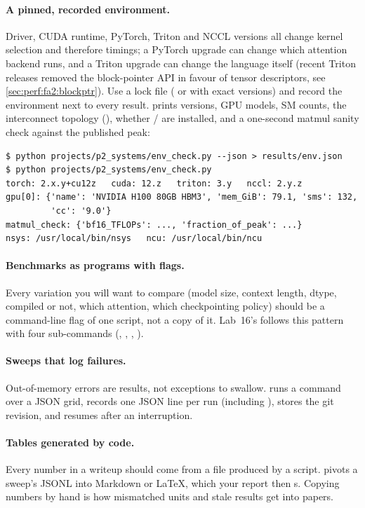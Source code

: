 \paragraph{A pinned, recorded environment.} Driver, CUDA runtime, PyTorch, Triton and NCCL
versions all change kernel selection and therefore timings; a PyTorch upgrade can change which
attention backend runs, and a Triton upgrade can change the language itself (recent Triton
releases removed the block-pointer API in favour of tensor descriptors, see
\cref{sec:perf:fa2:blockptr}). Use a lock file ( or  with exact
versions) and record the environment next to every result. 
prints versions, GPU models, SM counts, the interconnect topology (),
whether / are installed, and a one-second matmul sanity check against the
published peak:

\begin{lstlisting}[style=shell]
$ python projects/p2_systems/env_check.py --json > results/env.json
$ python projects/p2_systems/env_check.py
torch: 2.x.y+cu12z   cuda: 12.z   triton: 3.y   nccl: 2.y.z
gpu[0]: {'name': 'NVIDIA H100 80GB HBM3', 'mem_GiB': 79.1, 'sms': 132,
         'cc': '9.0'}
matmul_check: {'bf16_TFLOPs': ..., 'fraction_of_peak': ...}
nsys: /usr/local/bin/nsys   ncu: /usr/local/bin/ncu
\end{lstlisting}

\paragraph{Benchmarks as programs with flags.} Every variation you will want to compare
(model size, context length, dtype, compiled or not, which attention, which checkpointing
policy) should be a command-line flag of one script, not a copy of it. Lab~16's
 follows this pattern with four sub-commands (, ,
, ).

\paragraph{Sweeps that log failures.} Out-of-memory errors are results, not exceptions to swallow.
 runs a command over a JSON grid, records one JSON line per run
(including ), stores the git revision, and resumes after an interruption.

\paragraph{Tables generated by code.} Every number in a writeup should come from a file produced by
a script.  pivots a sweep's JSONL into Markdown or LaTeX, which your
report then s. Copying numbers by hand is how mismatched units and stale
results get into papers.

